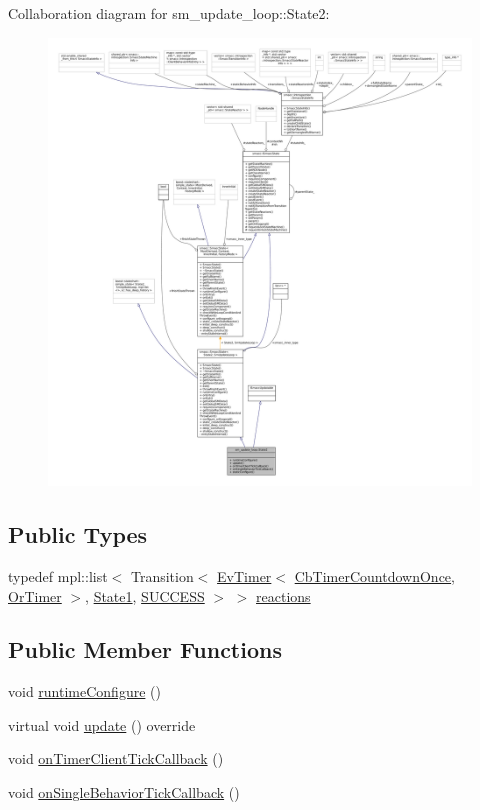 Collaboration diagram for sm\+\_\+update\+\_\+loop\+:\+:State2\+:
\nopagebreak
\begin{figure}[H]
\begin{center}
\leavevmode
\includegraphics[width=350pt]{structsm__update__loop_1_1State2__coll__graph}
\end{center}
\end{figure}
\subsection*{Public Types}
\begin{DoxyCompactItemize}
\item 
typedef mpl\+::list$<$ Transition$<$ \hyperlink{structcl__ros__timer_1_1EvTimer}{Ev\+Timer}$<$ \hyperlink{classcl__ros__timer_1_1CbTimerCountdownOnce}{Cb\+Timer\+Countdown\+Once}, \hyperlink{classsm__update__loop_1_1OrTimer}{Or\+Timer} $>$, \hyperlink{structsm__update__loop_1_1State1}{State1}, \hyperlink{structsmacc_1_1default__transition__tags_1_1SUCCESS}{S\+U\+C\+C\+E\+SS} $>$ $>$ \hyperlink{structsm__update__loop_1_1State2_a568e8e1054b11a61f72133866608b392}{reactions}
\end{DoxyCompactItemize}
\subsection*{Public Member Functions}
\begin{DoxyCompactItemize}
\item 
void \hyperlink{structsm__update__loop_1_1State2_ad817c7ed319628e2794a05bb6aa10921}{runtime\+Configure} ()
\item 
virtual void \hyperlink{structsm__update__loop_1_1State2_aab947246406d3225de2f83f336ae24a3}{update} () override
\item 
void \hyperlink{structsm__update__loop_1_1State2_a6de20c89117e60923ba556bedeb0d231}{on\+Timer\+Client\+Tick\+Callback} ()
\item 
void \hyperlink{structsm__update__loop_1_1State2_ab3e5ab2f3afd27d1550dda7f4e09b6fb}{on\+Single\+Behavior\+Tick\+Callback} ()
\end{DoxyCompactItemize}

